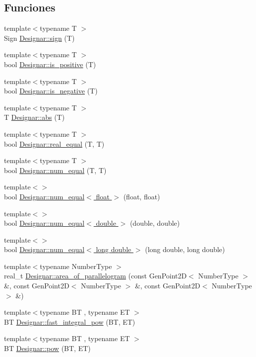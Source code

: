 \subsection*{Funciones}
\begin{DoxyCompactItemize}
\item 
{\footnotesize template$<$typename T $>$ }\\Sign \hyperlink{namespace_designar_a477673c7a4fe3e0307d96591620a0765}{Designar\+::sign} (T)
\item 
{\footnotesize template$<$typename T $>$ }\\bool \hyperlink{namespace_designar_a3b33787e014af6f2b15710970c0af068}{Designar\+::is\+\_\+positive} (T)
\item 
{\footnotesize template$<$typename T $>$ }\\bool \hyperlink{namespace_designar_afb0b402a3d6beb3873ff4408ad9ea43a}{Designar\+::is\+\_\+negative} (T)
\item 
{\footnotesize template$<$typename T $>$ }\\T \hyperlink{namespace_designar_ad1499bf1974e61fe7af9b09f5261ae57}{Designar\+::abs} (T)
\item 
{\footnotesize template$<$typename T $>$ }\\bool \hyperlink{namespace_designar_aa3e1023369fdb239670900996db45d05}{Designar\+::real\+\_\+equal} (T, T)
\item 
{\footnotesize template$<$typename T $>$ }\\bool \hyperlink{namespace_designar_ad193c81ed087e63575903c6775df36b2}{Designar\+::num\+\_\+equal} (T, T)
\item 
{\footnotesize template$<$$>$ }\\bool \hyperlink{namespace_designar_a29878d27cf434c0bac7093ec7b4d8613}{Designar\+::num\+\_\+equal$<$ float $>$} (float, float)
\item 
{\footnotesize template$<$$>$ }\\bool \hyperlink{namespace_designar_abc6408777e04d2c538830bf826901317}{Designar\+::num\+\_\+equal$<$ double $>$} (double, double)
\item 
{\footnotesize template$<$$>$ }\\bool \hyperlink{namespace_designar_a161c5a6c7e958d708e5898265c9a37f7}{Designar\+::num\+\_\+equal$<$ long double $>$} (long double, long double)
\item 
{\footnotesize template$<$typename Number\+Type $>$ }\\real\+\_\+t \hyperlink{namespace_designar_a0e768d9436448a70b1a1e2ec87b4d0ca}{Designar\+::area\+\_\+of\+\_\+parallelogram} (const Gen\+Point2D$<$ Number\+Type $>$ \&, const Gen\+Point2D$<$ Number\+Type $>$ \&, const Gen\+Point2D$<$ Number\+Type $>$ \&)
\item 
{\footnotesize template$<$typename BT , typename ET $>$ }\\BT \hyperlink{namespace_designar_a28b07c64f84f9fd04d1daa7f6e083aa2}{Designar\+::fast\+\_\+integral\+\_\+pow} (BT, ET)
\item 
{\footnotesize template$<$typename BT , typename ET $>$ }\\BT \hyperlink{namespace_designar_a94eeb5e794c32c27a0efc3e2218e9278}{Designar\+::pow} (BT, ET)
\end{DoxyCompactItemize}
